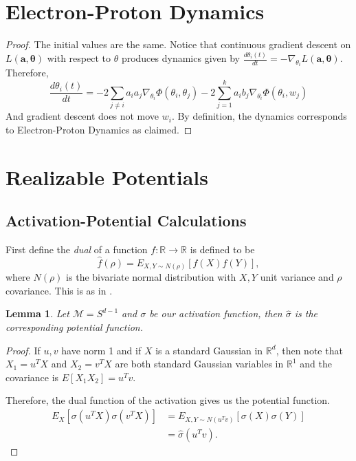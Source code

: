 \documentclass{article}
\newtheorem{lemma}[theorem]{Lemma}
\newcommand{\R}{{\mathbb{R}}}
\begin{document}
\newpage
\appendix

\section{Electron-Proton Dynamics}

\epdyn*

\begin{proof}
The initial values are the same. Notice that continuous gradient descent on $L(\boldsymbol{a,\theta})$ with respect to $\theta$ produces dynamics given by $\frac{d\theta_i(t)}{dt} = -\nabla_{\theta_i}L(\boldsymbol{a,\theta})$. Therefore,
\[\frac{d\theta_i(t)}{dt} = -2\sum_{j \neq i} a_i a_j
\nabla_{\theta_i}\Phi(\theta_i,\theta_j) - 2\sum_{j=1}^k
a_ib_j\nabla_{\theta_i} \Phi(\theta_i,w_j)\] 
And gradient descent does not move $w_i$. By definition, the dynamics corresponds to Electron-Proton Dynamics as claimed.
\end{proof}


\section{Realizable Potentials}
\label{realizable}

\subsection{Activation-Potential Calculations}
First define the {\it dual} of a function $f: \R \to \R$ is defined to be 
%
\[ \widehat{f}(\rho) = E_{X,Y \sim N(\rho)}[f(X)f(Y)],\]
%
where $N(\rho)$ is the bivariate normal distribution with $X, Y$ unit variance and $\rho$ covariance. This is as in \cite{DanielyFS16}.
%
\begin{lemma}\label{rotLem}
Let $\mathcal{M} = S^{d-1}$ and $\sigma$ be our activation function, then $\widehat{\sigma}$ is the corresponding potential function.
\end{lemma}

\begin{proof}
If $u, v$ have norm 1 and if $X$ is a standard Gaussian in $\R^d$, then note that $X_1 = u^TX$ and $X_2 = v^TX$ are both standard Gaussian variables in $\R^1$ and the covariance is $E[X_1X_2] = u^Tv$. 

Therefore, the dual function of the activation gives us the potential function.
\begin{align*}
E_{X}[\sigma(u^TX)\sigma(v^TX)] & =
E_{X,Y \sim N(u^Tv)}[\sigma(X)\sigma(Y)] \\
& = \widehat{\sigma}(u^Tv).
\end{align*}
\end{proof}
\end{document}
